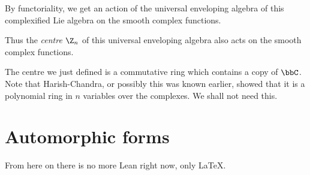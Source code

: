 \begin{definition}
  \label{instUniversalEnvelopingAlgebraAction}
By functoriality, we get an action of the universal enveloping algebra of this
complexified Lie algebra on the smooth complex functions.

\end{definition}

\begin{definition}
\label{instCentreAction}
Thus the \emph{centre} $\Z_n$ of this universal enveloping algebra also acts on the smooth
complex functions.

\end{definition}

\begin{remark} The centre we just defined is a commutative ring which contains a copy of $\bbC$.
  Note that Harish-Chandra, or possibly this was known earlier, showed that it is a polynomial
  ring in $n$ variables over the complexes. We shall not need this.
\end{remark}

\section{Automorphic forms}

From here on there is no more Lean right now, only LaTeX.

